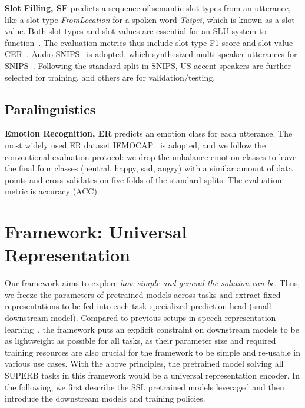 \documentclass[a4paper]{article}
\begin{document}
\textbf{Slot Filling, SF} predicts a sequence of semantic slot-types from an utterance, like a slot-type \textit{FromLocation} for a spoken word \textit{Taipei}, which is known as a slot-value.
Both slot-types and slot-values are essential for an SLU system to function~\cite{lai2020semi}.
The evaluation metrics thus include slot-type F1 score and slot-value CER~\cite{tomashenko2019recent}.
Audio SNIPS~\cite{lai2020semi} is adopted, which synthesized multi-speaker utterances for SNIPS~\cite{coucke2018snips}.
Following the standard split in SNIPS, US-accent speakers are further selected for training, and others are for validation/testing.

\subsection{Paralinguistics}

\textbf{Emotion Recognition, ER} predicts an emotion class for each utterance.
The most widely used ER dataset IEMOCAP~\cite{iemocap} is adopted, and we follow the conventional evaluation protocol: we drop the unbalance emotion classes to leave the final four classes (neutral, happy, sad, angry) with a similar amount of data points and cross-validates on five folds of the standard splits.
The evaluation metric is accuracy (ACC).

\section{Framework: Universal Representation}

Our framework aims to explore \textit{how simple and general the solution can be}. %
Thus, we freeze the parameters of pretrained models across tasks and extract fixed representations to be fed into each task-specialized prediction head (small downstream model).
Compared to previous setups in speech representation learning~\cite{tera,wav2vec,vq_wav2vec}, the framework puts an explicit constraint on downstream models to be as lightweight as possible for all tasks, as their parameter size and required training resources are also crucial for the framework to be simple and re-usable in various use cases.
With the above principles, the pretrained model solving all SUPERB tasks in this framework would be a universal representation encoder.
In the following, we first describe the SSL pretrained models leveraged and then introduce the downstream models and training policies.
\end{document}
